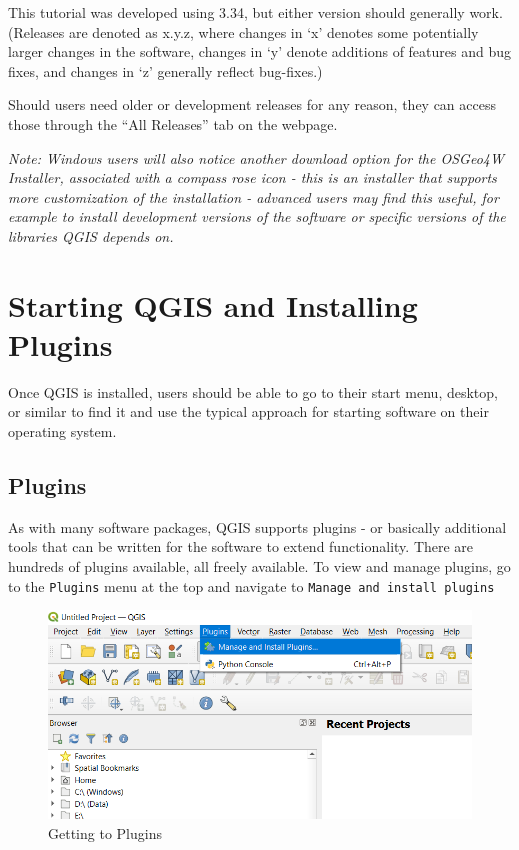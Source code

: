 \documentclass[
  letterpaper,
  DIV=11,
  numbers=noendperiod]{scrreprt}
\begin{document}
This tutorial was developed using 3.34, but either version should
generally work. (Releases are denoted as x.y.z, where changes in `x'
denotes some potentially larger changes in the software, changes in `y'
denote additions of features and bug fixes, and changes in `z' generally
reflect bug-fixes.)

Should users need older or development releases for any reason, they can
access those through the ``All Releases'' tab on the webpage.

\emph{Note: Windows users will also notice another download option for
the OSGeo4W Installer, associated with a compass rose icon - this is an
installer that supports more customization of the installation -
advanced users may find this useful, for example to install development
versions of the software or specific versions of the libraries QGIS
depends on.}

\hypertarget{starting-qgis-and-installing-plugins}{%
\section{Starting QGIS and Installing
Plugins}\label{starting-qgis-and-installing-plugins}}

Once QGIS is installed, users should be able to go to their start menu,
desktop, or similar to find it and use the typical approach for starting
software on their operating system.

\hypertarget{plugins}{%
\subsection{Plugins}\label{plugins}}

As with many software packages, QGIS supports plugins - or basically
additional tools that can be written for the software to extend
functionality. There are hundreds of plugins available, all freely
available. To view and manage plugins, go to the \texttt{Plugins} menu
at the top and navigate to \texttt{Manage\ and\ install\ plugins}

\begin{figure}

{\centering \includegraphics{./images/ToolbarToPlugins.png}

}

\caption{Getting to Plugins}

\end{figure}
\end{document}
